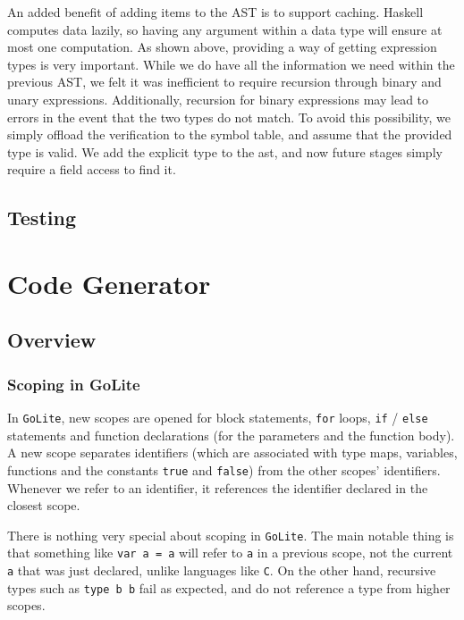 \documentclass[11pt]{article}
\begin{document}
An added benefit of adding items to the AST is to support caching.
Haskell computes data lazily, so having any argument within a
data type will ensure at most one computation.
As shown above, providing a way of getting expression types is very important. While we do have all the information we need within the previous AST,
we felt it was inefficient to require recursion through binary and unary expressions.
Additionally, recursion for binary expressions may lead to errors in the
event that the two types do not match. To avoid this possibility,
we simply offload the verification to the symbol table, and assume that the provided type is valid.
We add the explicit type to the ast, and now future stages simply require
a field access to find it.

\subsection{Testing} %

\section{Code Generator}
\subsection{Overview}
\subsubsection{Scoping in GoLite}
In \texttt{GoLite}, new scopes are opened for block statements,
\texttt{for} loops, \texttt{if} / \texttt{else} statements and
function declarations (for the parameters and the function body). A
new scope separates identifiers (which are associated with type maps,
variables, functions and the constants \texttt{true} and
\texttt{false}) from the other scopes' identifiers. Whenever we refer
to an identifier, it references the identifier declared in the closest
scope.

There is nothing very special about scoping in \texttt{GoLite}. The
main notable thing is that something like \texttt{var a = a} will
refer to \texttt{a} in a previous scope, not the current \texttt{a}
that was just declared, unlike languages like \texttt{C}.  On the
other hand, recursive types such as \texttt{type b b} fail as
expected, and do not reference a type from higher scopes.
\end{document}
